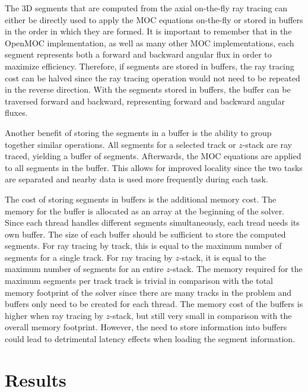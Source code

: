 The 3D segments that are computed from the axial on-the-fly ray tracing can either be directly used to apply the \ac{MOC} equations on-the-fly or stored in buffers in the order in which they are formed. It is important to remember that in the OpenMOC implementation, as well as many other \ac{MOC} implementations, each segment represents both a forward and backward angular flux in order to maximize efficiency. Therefore, if segments are stored in buffers, the ray tracing cost can be halved since the ray tracing operation would not need to be repeated in the reverse direction. With the segments stored in buffers, the buffer can be traversed forward and backward, representing forward and backward angular fluxes.

Another benefit of storing the segments in a buffer is the ability to group together similar operations. All segments for a selected track or $z$-stack are ray traced, yielding a buffer of segments. Afterwards, the \ac{MOC} equations are applied to all segments in the buffer. This allows for improved locality since the two tasks are separated and nearby data is used more frequently during each task.

The cost of storing segments in buffers is the additional memory cost. The memory for the buffer is allocated as an array at the beginning of the solver. Since each thread handles different segments simultaneously, each tread needs its own buffer. The size of each buffer should be sufficient to store the computed segments. For ray tracing by track, this is equal to the maximum number of segments for a single track. For ray tracing by $z$-stack, it is equal to the maximum number of segments for an entire $z$-stack. The memory required for the maximum segments per track track is trivial in comparison with the total memory footprint of the solver since there are many tracks in the problem and buffers only need to be created for each thread. The memory cost of the buffers is higher when ray tracing by $z$-stack, but still very small in comparison with the overall memory footprint. However, the need to store information into buffers could lead to detrimental latency effects when loading the segment information.

\section{Results}
\label{sec:rt-results}

